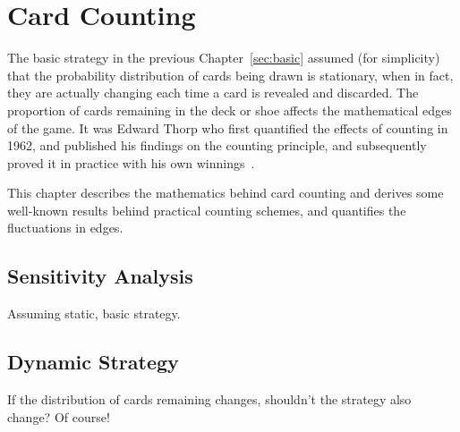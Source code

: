 
\chapter{Card Counting}
\label{sec:counting}

The basic strategy in the previous Chapter~\ref{sec:basic}
assumed (for simplicity) that the probability distribution
of cards being drawn is stationary, when in fact, 
they are actually changing each time a card is revealed and discarded.
The proportion of cards remaining in the deck or shoe
affects the mathematical edges of the game.
It was Edward Thorp who first quantified the effects of counting in 1962, 
and published his findings on the counting principle,
and subsequently proved it in practice
with his own winnings~\cite{ref:thorp62}.  

This chapter describes the mathematics behind card counting
and derives some well-known results behind practical counting schemes, 
and quantifies the fluctuations in edges.  

\section{Sensitivity Analysis}
\label{sec:counting:sensitivity}

Assuming static, basic strategy.

\section{Dynamic Strategy}
\label{sec:counting:dynamic}

If the distribution of cards remaining changes, 
shouldn't the strategy also change?
Of course!


